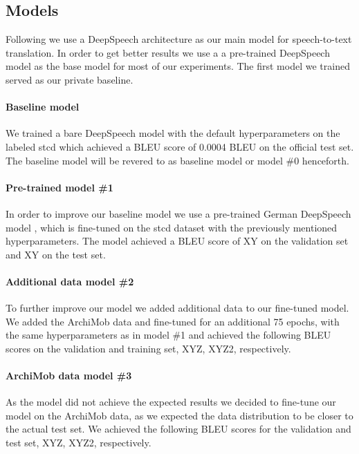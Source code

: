 
\subsection{Models}
Following  we use a DeepSpeech architecture \cite{Hannun2014DeepSS} as our main model for speech-to-text translation. In order to get better results we use a
a pre-trained DeepSpeech model \cite{DeepSpeechGerman090} as the base model for most of our experiments. The first model we trained served as our private baseline. \paragraph{Baseline model} We trained a bare DeepSpeech model with the default hyperparameters
on the labeled \gls{stcd} which achieved a BLEU score of 0.0004 BLEU on the official test set. The baseline model will be revered to as baseline model or model \#0 henceforth.\paragraph{Pre-trained model \#1} In order to improve our baseline model we use a pre-trained
German DeepSpeech model \cite{DeepSpeechGerman090}, which is fine-tuned on the \gls{stcd} dataset with the previously mentioned hyperparameters. The model achieved a BLEU score of
XY on the validation set and XY on the test set.
\paragraph{Additional data model \#2} To further improve our  model we added additional data to our fine-tuned model. We added the ArchiMob data and fine-tuned for an additional 75 epochs, with
the same hyperparameters as in model \#1 and achieved the following BLEU scores on the validation and training set, XYZ, XYZ2, respectively.
\paragraph{ArchiMob data model \#3} As the  model did not achieve the expected results we decided to fine-tune our model on the ArchiMob data, as we expected the data distribution to be closer
to the actual test set. We achieved the following BLEU scores for the validation and test set, XYZ, XYZ2,
respectively.
